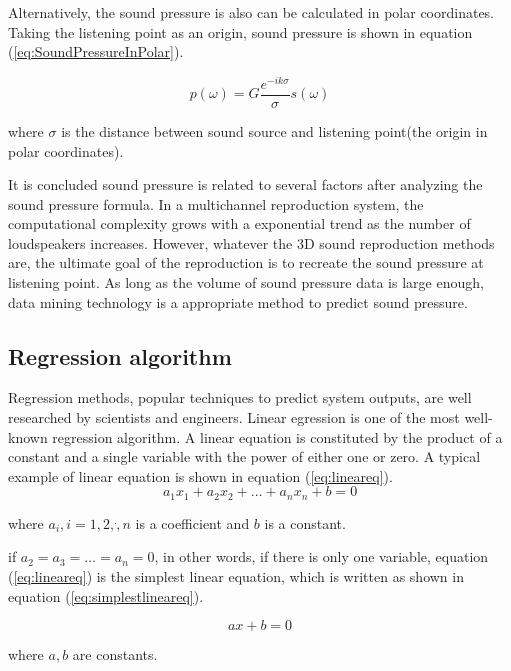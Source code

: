 \documentclass[runningheads,a4paper]{llncs}
\begin{document}
Alternatively, the sound pressure is also can be calculated in polar coordinates. Taking the listening point as an origin, sound pressure is shown in equation (\ref{eq:SoundPressureInPolar}).

\begin{equation}\label{eq:SoundPressureInPolar}
p(\omega)=G\frac{e^{-ik\sigma}}{\sigma}s(\omega)
\end{equation}

where $\sigma$ is the distance between sound source and listening point(the origin in polar coordinates).

It is concluded sound pressure is related to several factors after analyzing the sound pressure formula. In a multichannel reproduction system, the computational complexity grows with a exponential trend as the number of loudspeakers increases. However, whatever the 3D sound reproduction methods are, the ultimate goal of the reproduction is to recreate the sound pressure at listening point. As long as the volume of sound pressure data is large enough, data mining technology is a appropriate method to predict sound pressure.


\subsection{Regression algorithm}
Regression methods, popular techniques to predict system outputs, are well researched by scientists and engineers. Linear egression is one of the most well-known regression algorithm\cite{Hahne14Linear}\cite{Peter15The}. A linear equation is constituted by the product of a constant and  a single variable with the power of either one or zero. A typical example of linear equation is shown in equation (\ref{eq:lineareq}).
\begin{equation}\label{eq:lineareq}
    a_1x_1+a_2x_2+\dots+a_nx_n+b=0 
\end{equation}

where $ a_i,i=1,2,\dot,n $ is a coefficient and $b$ is a constant. 

if $a_2=a_3=\dots=a_n=0$, in other words, if there is only one variable, equation (\ref{eq:lineareq}) is the simplest linear equation, which is written as shown in equation (\ref{eq:simplestlineareq}).

\begin{equation}\label{eq:simplestlineareq}
    ax+b=0 
\end{equation}

where $ a, b$ are constants. 
\end{document}
